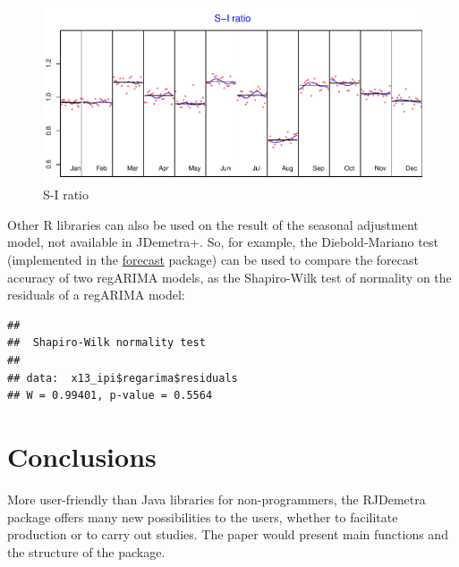 \documentclass[12pt,a4paper]{article}
\newenvironment{Shaded}{\begin{snugshade}}{\end{snugshade}}
\newcommand{\KeywordTok}[1]{\textcolor[rgb]{0.13,0.29,0.53}{\textbf{#1}}}
\newcommand{\OperatorTok}[1]{\textcolor[rgb]{0.81,0.36,0.00}{\textbf{#1}}}
\newcommand{\NormalTok}[1]{#1}
\begin{document}
\begin{figure}[H]
\centering
\includegraphics{NTTS_files/figure-latex/unnamed-chunk-3-1.pdf}
\caption{\label{fig:sa_si_ratio}S-I ratio}
\end{figure}

Other R libraries can also be used on the result of the seasonal
adjustment model, not available in JDemetra+. So, for example, the
Diebold-Mariano test (implemented in the
\href{ttps://CRAN.R-project.org/package=forecast}{forecast} package) can
be used to compare the forecast accuracy of two regARIMA models, as the
Shapiro-Wilk test of normality on the residuals of a regARIMA model:

\begin{Shaded}
\end{Shaded}

\begin{verbatim}
## 
##  Shapiro-Wilk normality test
## 
## data:  x13_ipi$regarima$residuals
## W = 0.99401, p-value = 0.5564
\end{verbatim}

\section{Conclusions}\label{conclusions}

More user-friendly than Java libraries for non-programmers, the RJDemetra package offers many new possibilities to the users, whether to facilitate production or to carry out studies. The paper would present main functions and the structure of the package. \cite{Lamport89}


%
\renewcommand{\refname}{References}

\printbibliography %
\end{document}
